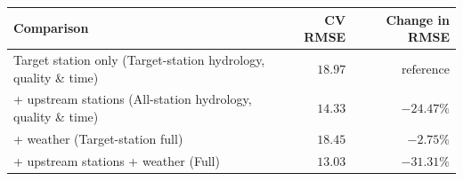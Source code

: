 \begin{tabularx}{\textwidth}{@{}Xrr@{}}
\toprule
\textbf{Comparison} & \textbf{CV RMSE} & \textbf{Change in RMSE} \\
\midrule
Target station only (Target-station hydrology, quality \& time) & $18.97$ & $\text{reference}$ \\
\addlinespace
+ upstream stations (All-station hydrology, quality \& time) & $14.33$ & $-24.47\%$ \\
\addlinespace
+ weather (Target-station full) & $18.45$ & $-2.75\%$ \\
\addlinespace
+ upstream stations + weather (Full) & $13.03$ & $-31.31\%$ \\
\bottomrule
\end{tabularx}
